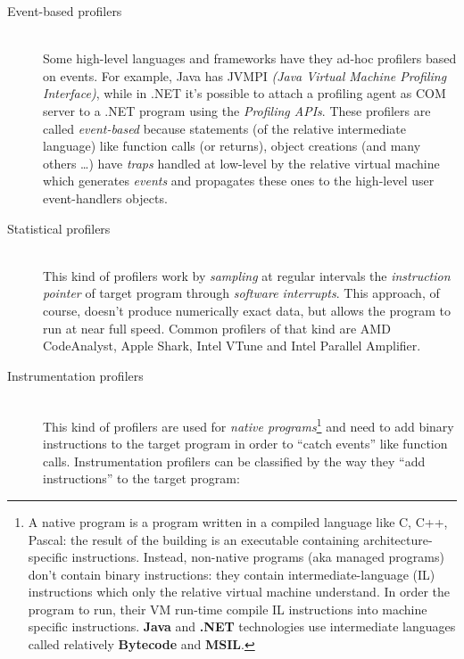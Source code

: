 \documentclass[a4paper,11pt]{report}
\begin{document}
\begin{description}
\item[Event-based profilers] \hfill \\
Some high-level languages and frameworks have they ad-hoc profilers based on events. For example, Java has JVMPI \textit{(Java Virtual Machine Profiling Interface)}, while in .NET it's possible to attach a profiling agent as COM server to a .NET program using the \emph{Profiling APIs}. These profilers are called \emph{event-based} because statements (of the relative intermediate language) like function calls (or returns), object creations (and many others \ldots) have \emph{traps} handled at low-level by the relative virtual machine which generates \emph{events} and propagates these ones to the high-level user event-handlers objects.
\item[Statistical profilers] \hfill \\
This kind of profilers work by \emph{sampling} at regular intervals the \emph{instruction pointer} of target program through \emph{software interrupts}. This approach, of course, doesn't produce numerically exact data, but allows the program to run at near full speed. Common profilers of that kind are AMD CodeAnalyst, Apple Shark, Intel VTune and Intel Parallel Amplifier.
\item[Instrumentation profilers] \hfill \\

This kind of profilers are used for \emph{native programs}\footnote{A native program is a program written in a compiled language like C, C++, Pascal: the result of the building is an executable containing architecture-specific instructions. Instead, non-native programs (aka managed programs) don't contain binary instructions: they contain intermediate-language (IL) instructions which only the relative virtual machine understand. In order the program to run, their VM run-time compile IL instructions into machine specific instructions. \textbf{Java} and \textbf{.NET} technologies use intermediate languages called relatively \textbf{Bytecode} and \textbf{MSIL}.} and need to add binary instructions to the target program in order to ``catch events'' like function calls. Instrumentation profilers can be classified by the way they ``add instructions'' to the target program:


\end{description}
\end{document}
